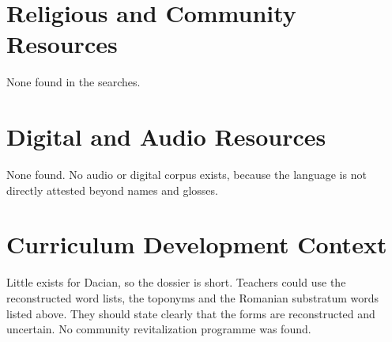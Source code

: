 \documentclass[12pt]{article}
\begin{document}
\section{Religious and Community Resources}
None found in the searches.

\section{Digital and Audio Resources}
None found. No audio or digital corpus exists, because the language is not directly attested beyond names and glosses.

\section{Curriculum Development Context}
Little exists for Dacian, so the dossier is short. Teachers could use the reconstructed word lists, the toponyms and the Romanian substratum words listed above. They should state clearly that the forms are reconstructed and uncertain. No community revitalization programme was found.
\end{document}
